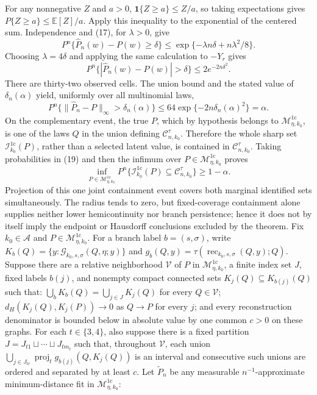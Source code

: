 For any nonnegative \(Z\) and \(a>0\), \(\mathbf 1\{Z\geq a\}\leq Z/a\), so taking expectations gives \(P\{Z\geq a\}\leq \mathbb E[Z]/a\).  Apply this inequality to the exponential of the centered sum.  Independence and (17), for \(\lambda>0\), give
\[
 P^n\{\widehat P_n(w)-P(w)\geq\delta\}
 \leq\exp\{-\lambda n\delta+n\lambda^2/8\}.
\]
Choosing \(\lambda=4\delta\) and applying the same calculation to \(-Y_r\) gives
\[
 P^n\{|\widehat P_n(w)-P(w)|>\delta\}\leq2e^{-2n\delta^2}.
 \tag{18}
\]
There are thirty-two observed cells.  The union bound and the stated value of \(\delta_n(\alpha)\) yield, uniformly over all multinomial laws,
\[
 P^n\{\|\widehat P_n-P\|_\infty>\delta_n(\alpha)\}
 \leq64\exp\{-2n\delta_n(\alpha)^2\}=\alpha.
 \tag{19}
\]
On the complementary event, the true \(P\), which by hypothesis belongs to \(\mathcal M_{\eta,k_0}^{1\mathrm c}\), is one of the laws \(Q\) in the union defining \(\mathcal C_{n,k_0}^{\tau}\).  Therefore the whole sharp set \(\mathcal I_{k_0}^{1\mathrm c}(P)\), rather than a selected latent value, is contained in \(\mathcal C_{n,k_0}^{\tau}\).  Taking probabilities in (19) and then the infimum over \(P\in\mathcal M_{\eta,k_0}^{1\mathrm c}\) proves
\[
 \inf_{P\in\mathcal M_{\eta,k_0}^{1\mathrm c}}
 P^n\{\mathcal I_{k_0}^{1\mathrm c}(P)\subseteq\mathcal C_{n,k_0}^{\tau}\}
 \geq1-\alpha.
\]
Projection of this one joint containment event covers both marginal identified sets simultaneously.  The radius tends to zero, but fixed-coverage containment alone supplies neither lower hemicontinuity nor branch persistence; hence it does not by itself imply the endpoint or Hausdorff conclusions excluded by the theorem.
Fix \(k_0\in\mathcal A\) and \(P\in\mathcal M_{\eta,k_0}^{1\mathrm c}\).  For a branch label \(b=(s,\sigma)\), write \(K_b(Q)=\{y:\mathscr G_{k_0,s,\sigma}(Q,\eta;y)\}\) and \(g_b(Q,y)=\tau(\operatorname{rec}_{k_0,s,\sigma}(Q,y);Q)\).  Suppose there are a relative neighborhood \(\mathcal V\) of \(P\) in \(\mathcal M_{\eta,k_0}^{1\mathrm c}\), a finite index set \(J\), fixed labels \(b(j)\), and nonempty compact connected sets \(K_j(Q)\subseteq K_{b(j)}(Q)\) such that: \(\bigcup_{b}K_b(Q)=\bigcup_{j\in J}K_j(Q)\) for every \(Q\in\mathcal V\); \(d_H(K_j(Q),K_j(P))\to0\) as \(Q\to P\) for every \(j\); and every reconstruction denominator is bounded below in absolute value by one common \(c>0\) on these graphs.  For each \(t\in\{3,4\}\), also suppose there is a fixed partition \(J=J_{t1}\sqcup\cdots\sqcup J_{tm_t}\) such that, throughout \(\mathcal V\), each union \(\bigcup_{j\in J_{tr}}\operatorname{proj}_t g_{b(j)}(Q,K_j(Q))\) is an interval and consecutive such unions are ordered and separated by at least \(c\).  Let \(\widetilde P_n\) be any measurable \(n^{-1}\)-approximate minimum-distance fit in \(\mathcal M_{\eta,k_0}^{1\mathrm c}\):
